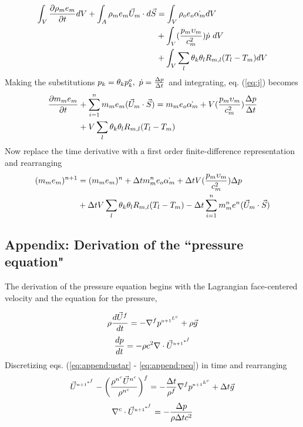 \documentclass[fleqn]{article}
\begin{document}
{\begin{align}
    \label{eq:j}
        \int_{V}\pd{\rhom e_m}{t}dV + \int_{A} \rhom e_m \um \cdot d\vec{S} 
&   =   \int_{V} \rho_o e_o \dot{\alpham}dV \notag \\
&   +   \int_{V}(\frac{  p_{m} \upsilon_m  }{ c^{2}_{m} }  ) \dot{p}~dV \notag\\
&   +   \int_{V} \sum_{l} \theta_k \theta_l R_{m,l}(T_l - T_m)dV
\end{align}
%
Making the substitutions
$p_k=\theta_{k}p^{o}_{k},~\dot{p}=\frac{\Delta{p}}{\delt}$ and integrating,
eq. (\ref{eq:j}) becomes
%
\begin{align*}
    \pd{m_m e_m}{t} &+ \sumarea m_m e_m (\um \cdot \vec{S})
    =   m_m e_o \dot{\alpham}
    +   V(\frac{  p_{m} \upsilon_m  }{ c^{2}_{m} }  ) \frac{\Delta{p}}{\delt}\\
&   +   V\sum_{l} \theta_k \theta_l R_{m,l}(T_l - T_m)
\end{align*}
%
Now replace the time derivative with a first order finite-difference
representation and rearranging\\
%
  \begin{align}
        (m_m e_m)^{n+1} 
&   =   (m_m e_m)^{n}
    +   \delt \massnm e_o \dot{\alpham}
    +   \delt V(\frac{  p_{m} \upsilon_m  }{ c^{2}_{m} }  ) \Delta{p} \notag\\
&   +   \delt V\sum_{l} \theta_k \theta_l R_{m,l}(T_l - T_m)
    -   \delt \sumarea \massnm \en (\um \cdot \vec{S})
  \end{align}
%
\subsection{Appendix: Derivation of the ``pressure equation"}
The derivation of the pressure equation begins with the Lagrangian face-centered
velocity and the equation for the pressure,  %

\begin{equation}
    \label{eq:append:ustar}
    \rho \frac{d \vec{U}^{f} }{dt} 
    = 
    -\nabla^{f}\pnnLc + \rho \vec{g}
\end{equation}
%
\begin{equation}
  \label{eq:append:peq}
  \frac{ dp }{ dt } 
  = 
  -\rho c^{2} \nabla \cdot \ustar
\end{equation}
%
Discretizing eqs. (\ref{eq:append:ustar} - \ref{eq:append:peq}) in time and rearranging
%
\begin{equation}
    \label{eq:append:tmp}
    \ustar - \biggl{(}\frac{\rhonc\unc}{\rhonc}\biggr{)}^f 
    = 
    -\frac{\delt}{\rho^{f}} \nabla^{f}\pnnLc + \delt\vec{g}
\end{equation}
%
\begin{equation}
    \label{eq:append:peq2}
    \nabla^{c} \cdot \ustar 
    = 
    - \frac{ \Delta{p}}{\rho \delt c^2}
\end{equation}
%

}
\end{document}
